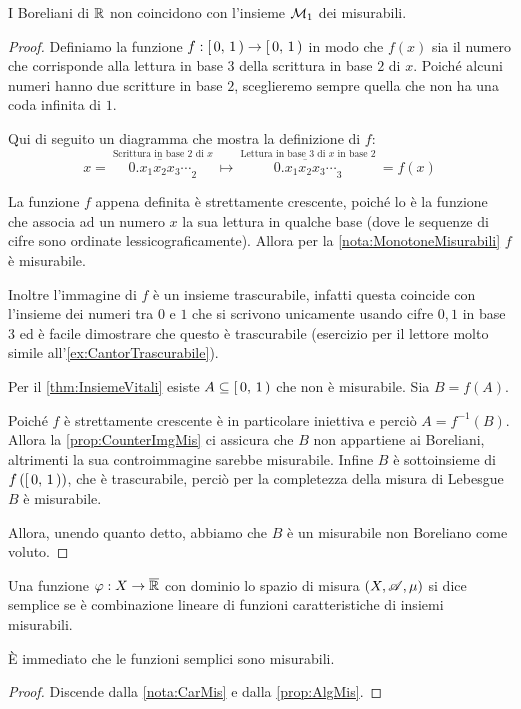 \begin{proposition}\label{prop:BorelianiNonMisurabili2}
	I Boreliani di $\mathbb R$ non coincidono con l'insieme $\mathcal M_1$ dei misurabili.
\end{proposition}
\begin{proof}
	Definiamo la funzione $f:\left[\,0,\,1\,\right)\to \left[\,0,\,1\,\right)$ in modo che $f(x)$ sia il numero che corrisponde alla lettura in base $3$ della scrittura in base $2$ di $x$.
	Poiché alcuni numeri hanno due scritture in base $2$, sceglieremo sempre quella che non ha una coda infinita di $1$.
	
	Qui di seguito un diagramma che mostra la definizione di $f$:
	\begin{equation*}
		x=\>\stackrel{\text{Scrittura in base $2$ di $x$}}{\overline{0.x_1x_2x_3\cdots}_2} \>  \longmapsto
		\> \stackrel{\text{Lettura in base $3$ di $x$ in base $2$}}{\overline{0.x_1x_2x_3\cdots}_3}\>=f(x)
	\end{equation*}

	La funzione $f$ appena definita è strettamente crescente, poiché lo è la funzione che associa ad un numero $x$ la sua lettura in qualche base (dove le sequenze di cifre sono ordinate lessicograficamente). Allora per la \cref{nota:MonotoneMisurabili} $f$ è misurabile.
	
	Inoltre l'immagine di $f$ è un insieme trascurabile, infatti questa coincide con l'insieme dei numeri tra $0$ e $1$ che si scrivono unicamente usando cifre $0,1$ in base $3$ ed è facile dimostrare che questo è trascurabile (esercizio per il lettore molto simile all'\cref{ex:CantorTrascurabile}).
	
	Per il \cref{thm:InsiemeVitali} esiste $A\subseteq \left[\,0,\,1\,\right)$ che non è misurabile.
	Sia $B=f(A)$.
	
	Poiché $f$ è strettamente crescente è in particolare iniettiva e perciò $A=f^{-1}(B)$.
	Allora la \cref{prop:CounterImgMis} ci assicura che $B$ non appartiene ai Boreliani, altrimenti la sua controimmagine sarebbe misurabile. 
	Infine $B$ è sottoinsieme di $f\left(\left[\,0,\,1\,\right)\right)$, che è trascurabile, perciò per la completezza della misura di Lebesgue $B$ è misurabile.
	
	Allora, unendo quanto detto, abbiamo che $B$ è un misurabile non Boreliano come voluto.
\end{proof}



\begin{definition}
	Una funzione $\varphi:X \rightarrow \overline{\mathbb R}$ con dominio lo spazio di misura $(X,\mathscr A,\mu)$ si dice semplice se è combinazione lineare di
	funzioni caratteristiche di insiemi misurabili.
\end{definition}
\begin{remark}
	È immediato che le funzioni semplici sono misurabili.
\end{remark}
\begin{proof}
	Discende dalla \cref{nota:CarMis} e dalla \cref{prop:AlgMis}.
\end{proof}


